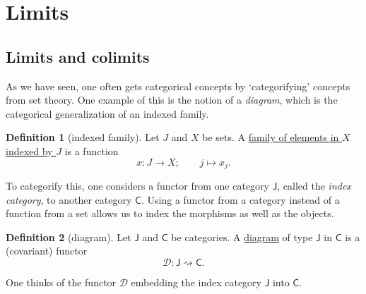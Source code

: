 \documentclass[a4paper,10pt]{scrreprt}
\newcommand{\defn}[1]{\ul{#1}}
\theoremstyle{definition}
\newtheorem{definition}{Definition}[section]
\theoremstyle{plain}
\theoremstyle{remark}
\begin{document}
\section{Limits} \label{sec:limits}
\subsection{Limits and colimits}
As we have seen, one often gets categorical concepts by `categorifying' concepts from set theory. One example of this is the notion of a \emph{diagram}, which is the categorical generalization of an indexed family.

\begin{definition}[indexed family]
  \label{def:indexedfamily}
  Let $J$ and $X$ be sets. A \defn{family of elements in $X$ indexed by $J$} is a function
  \begin{equation*}
    x\colon J \to X;\qquad j \mapsto x_{j}.
  \end{equation*}
\end{definition}

To categorify this, one considers a functor from one category $\mathsf{J}$, called the \emph{index category}, to another category $\mathsf{C}$. Using a functor from a category instead of a function from a set allows us to index the morphisms as well as the objects. 

\begin{definition}[diagram]
  \label{def:diagram}
  Let $\mathsf{J}$ and $\mathsf{C}$ be categories. A \defn{diagram} of type $\mathsf{J}$ in $\mathsf{C}$ is a (covariant) functor
  \begin{equation*}
    \mathcal{D}\colon \mathsf{J} \rightsquigarrow \mathsf{C}.
  \end{equation*}
\end{definition}

One thinks of the functor $\mathcal{D}$ embedding the index category $\textsf{J}$ into $\mathsf{C}$.
\end{document}
